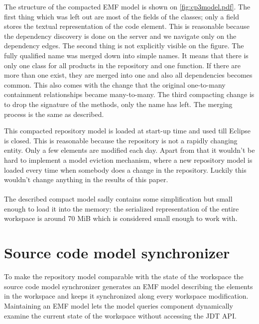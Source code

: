 The structure of the compacted EMF model is shown on \autoref{fig:cp3model.pdf}.
The first thing which was left out are most of the fields of the classes; only a
 field stores the textual representation of the code element. This is
reasonable because the dependency discovery is done on the server and we
navigate only on the dependency edges. The second thing is not explicitly
visible on the figure. The fully qualified name was merged down into simple
names. It means that there is only one  class for all products in
the repository and one  function. If there are more than one
exist, they are merged into one and also all dependencies becomes common. This
also comes with the change that the original one-to-many containment
relationships became many-to-many. The third compacting change is to drop the
signature of the methods, only the name has left. The merging process is the
same as described.

This compacted repository model is loaded at start-up time and used till Eclipse
is closed. This is reasonable because the repository is not a rapidly changing
entity. Only a few elements are modified each day. Apart from that it wouldn't
be hard to implement a model eviction mechanism, where a new repository model is
loaded every time when somebody does a change in the repository. Luckily this 
wouldn't change anything in the results of this paper.  

\paragraph{}
The described compact model sadly contains some simplification but small enough to
load it into the memory: the serialized representation of the entire workspace is
around 70 MiB which is considered small enough to work with. 

\section{Source code model synchronizer}
To make the repository model comparable with the state of the workspace the
source code model synchronizer generates an EMF model describing the elements
in the workspace and keeps it synchronized along every workspace modification.
Maintaining an EMF model lets the model queries component dynamically examine
the current state of the workspace without accessing the JDT API.

